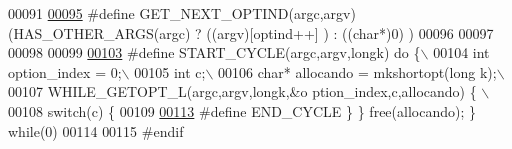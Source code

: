 \begin{DoxyCode}
00091 \textcolor{preprocessor}{}
\hypertarget{params_8h_source_l00095}{}\hyperlink{params_8h_aee0a3c4f579d6dd25dd1f7a7a7ad9270}{00095} \textcolor{preprocessor}{#define GET\_NEXT\_OPTIND(argc,argv)      (HAS\_OTHER\_ARGS(argc) ? ((argv)[optind++]
      ) : ((char*)0) )}
00096 \textcolor{preprocessor}{}
00097 
00098 
00099 
\hypertarget{params_8h_source_l00103}{}\hyperlink{params_8h_a8776d923eee38be0af8b743ac50e4a85}{00103} \textcolor{preprocessor}{#define START\_CYCLE(argc,argv,longk)    do \{\(\backslash\)}
00104 \textcolor{preprocessor}{                                                int option\_index = 0;\(\backslash\)}
00105 \textcolor{preprocessor}{                                                int c;\(\backslash\)}
00106 \textcolor{preprocessor}{                                                char* allocando = mkshortopt(long
      k);\(\backslash\)}
00107 \textcolor{preprocessor}{                                                WHILE\_GETOPT\_L(argc,argv,longk,&o
      ption\_index,c,allocando) \{ \(\backslash\)}
00108 \textcolor{preprocessor}{                                                switch(c) \{     }
00109 \textcolor{preprocessor}{}
\hypertarget{params_8h_source_l00113}{}\hyperlink{params_8h_a7cd88e938d4078f0694f78d22e5c5ca4}{00113} \textcolor{preprocessor}{#define END\_CYCLE                        \} \} free(allocando); \} while(0)}
00114 \textcolor{preprocessor}{}
00115 \textcolor{preprocessor}{#endif}
\end{DoxyCode}
